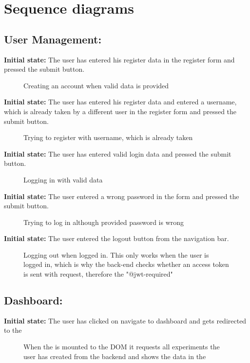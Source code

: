 \newcommand{\sequenceDiagram}[5]{
\par{\textbf{Initial state:} #1}\label{#5}
\begin{figure}[!ht]
    \centering
    
    \centering
    \caption{#4}\label{fig:#5}
\end{figure}
}


\section{Sequence diagrams}
\subsection*{User Management:}
\sequenceDiagram{The user has entered his register data in the register form and pressed the submit button.}{1}{images/sequence_diagrams/register_valid_data_diagram}{Creating an account when valid data is provided}{register_valid_data_diagram}

\sequenceDiagram{The user has entered his register data and entered a username, which is already taken by a different user in the register form and pressed the submit button.}{1}{images/sequence_diagrams/register_username_already_exists_diagram}{Trying to register with username, which is already taken}{register_username_already_exists_diagram}


\newpage
\sequenceDiagram{The user has entered valid login data and pressed the submit button.}{1}{images/sequence_diagrams/logging_in_valid_data_diagram}{Logging in with valid data}{logging_in_valid_data_diagram}

\sequenceDiagram{The user entered a wrong password in the form and pressed the submit button.}{1}{images/sequence_diagrams/logging_in_when_wrong_password_diagram}{Trying to log in although provided password is wrong}{logging_in_with_wrong_password_diagram}

\newpage
\sequenceDiagram{The user entered the logout button from the navigation bar.}{0.8}{images/sequence_diagrams/logout_diagram}{Logging out when logged in. This only works when the user is logged in, which is why the back-end checks whether an access token is sent with request, therefore the "@jwt-required"}{logout_diagram}


\subsection*{Dashboard:}
\sequenceDiagram{The user has clicked on navigate to dashboard and gets redirected to the \typeRef{DashboardView}}{1}{images/sequence_diagrams/dashboard_load}{When the \typeRef{DashboardView} is mounted to the DOM it requests all experiments the user has created from the backend and shows the data in the \typeRef{DashboardTable}}{dashboard_load}

